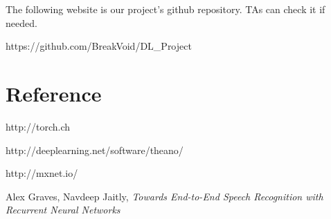 \documentclass[12pt]{article}
\begin{document}
The following website is our project’s github repository. TAs can check it if needed. 

https://github.com/BreakVoid/DL\_Project

\section{Reference}
\noindent [1] http://torch.ch

\noindent [2] http://deeplearning.net/software/theano/

\noindent [3] http://mxnet.io/

\noindent [4] Alex Graves, Navdeep Jaitly, {\it Towards End-to-End Speech Recognition with Recurrent Neural Networks}
\end{document}
